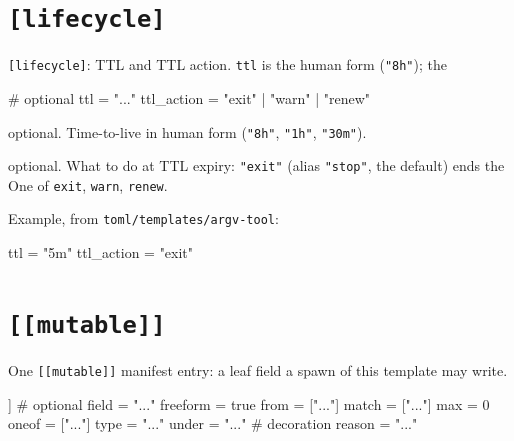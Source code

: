 \hypertarget{lifecycle}{%
\section{\texorpdfstring{\texttt{{[}lifecycle{]}}}{{[}lifecycle{]}}}\label{lifecycle}}

\texttt{{[}lifecycle{]}}: TTL and TTL action. \texttt{ttl} is the human
form (\texttt{"8h"}); the

\begin{kennelcode}
[lifecycle]
# optional
ttl      = "..."
ttl_action = "exit" | "warn" | "renew"
\end{kennelcode}

\begin{description}
\tightlist
\item[\texttt{ttl}]
optional. Time-to-live in human form (\texttt{"8h"}, \texttt{"1h"},
\texttt{"30m"}).
\item[\texttt{ttl\_action}]
optional. What to do at TTL expiry: \texttt{"exit"} (alias
\texttt{"stop"}, the default) ends the One of \texttt{exit},
\texttt{warn}, \texttt{renew}.
\end{description}

Example, from \texttt{toml/templates/argv-tool}:

\begin{kennelcode}
[lifecycle]
ttl = "5m"
ttl_action = "exit"
\end{kennelcode}

\hypertarget{mutable}{%
\section{\texorpdfstring{\texttt{{[}{[}mutable{]}{]}}}{{[}{[}mutable{]}{]}}}\label{mutable}}

One \texttt{{[}{[}mutable{]}{]}} manifest entry: a leaf field a spawn of
this template may write.

\begin{kennelcode}
[[mutable]]
# optional
field    = "..."
freeform = true
from     = ["..."]
match    = ["..."]
max      = 0
oneof    = ["..."]
type     = "..."
under    = "..."
# decoration
reason   = "..."
\end{kennelcode}

